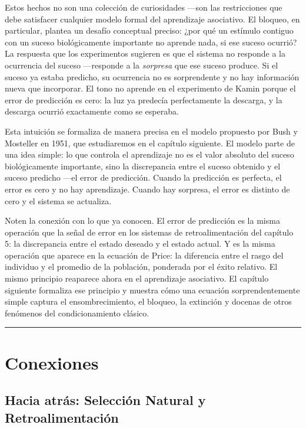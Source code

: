 \documentclass[
  letterpaper,
  DIV=11,
  numbers=noendperiod]{scrreprt}
\begin{document}
\begin{tcolorbox}[enhanced jigsaw, arc=.35mm, bottomrule=.15mm, breakable, colback=white, colframe=quarto-callout-note-color-frame, left=2mm, leftrule=.75mm, opacityback=0, rightrule=.15mm, toprule=.15mm]
Estos hechos no son una colección de curiosidades ---son las
restricciones que debe satisfacer cualquier modelo formal del
aprendizaje asociativo. El bloqueo, en particular, plantea un desafío
conceptual preciso: ¿por qué un estímulo contiguo con un suceso
biológicamente importante no aprende nada, si ese suceso ocurrió? La
respuesta que los experimentos sugieren es que el sistema no responde a
la ocurrencia del suceso ---responde a la \emph{sorpresa} que ese suceso
produce. Si el suceso ya estaba predicho, su ocurrencia no es
sorprendente y no hay información nueva que incorporar. El tono no
aprende en el experimento de Kamin porque el error de predicción es
cero: la luz ya predecía perfectamente la descarga, y la descarga
ocurrió exactamente como se esperaba.

Esta intuición se formaliza de manera precisa en el modelo propuesto por
Bush y Mosteller en 1951, que estudiaremos en el capítulo siguiente. El
modelo parte de una idea simple: lo que controla el aprendizaje no es el
valor absoluto del suceso biológicamente importante, sino la
discrepancia entre el suceso obtenido y el suceso predicho ---el error
de predicción. Cuando la predicción es perfecta, el error es cero y no
hay aprendizaje. Cuando hay sorpresa, el error es distinto de cero y el
sistema se actualiza.

Noten la conexión con lo que ya conocen. El error de predicción es la
misma operación que la señal de error en los sistemas de
retroalimentación del capítulo 5: la discrepancia entre el estado
deseado y el estado actual. Y es la misma operación que aparece en la
ecuación de Price: la diferencia entre el rasgo del individuo y el
promedio de la población, ponderada por el éxito relativo. El mismo
principio reaparece ahora en el aprendizaje asociativo. El capítulo
siguiente formaliza ese principio y muestra cómo una ecuación
sorprendentemente simple captura el ensombrecimiento, el bloqueo, la
extinción y docenas de otros fenómenos del condicionamiento clásico.

\begin{center}\rule{0.5\linewidth}{0.5pt}\end{center}

\section{Conexiones}\label{conexiones-1}

\subsection{Hacia atrás: Selección Natural y
Retroalimentación}\label{hacia-atruxe1s-selecciuxf3n-natural-y-retroalimentaciuxf3n}


\end{tcolorbox}
\end{document}
